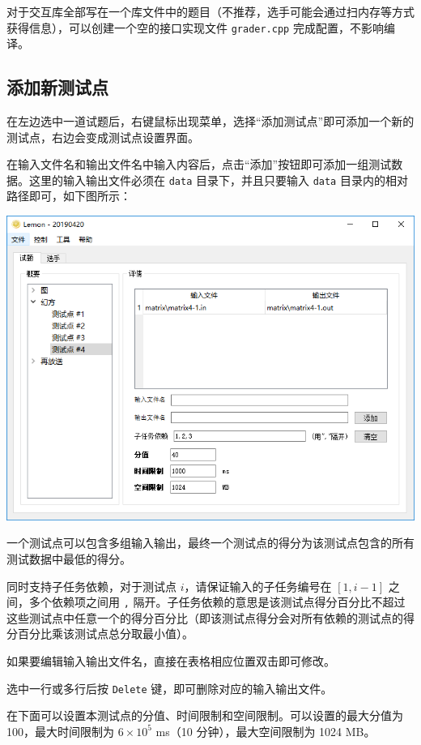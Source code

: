 \documentclass[12pt, a4paper]{article}
\begin{document}
对于交互库全部写在一个库文件中的题目（不推荐，选手可能会通过扫内存等方式获得信息），可以创建一个空的接口实现文件 \texttt{grader.cpp} 完成配置，不影响编译。

\subsection{添加新测试点}

在左边选中一道试题后，右键鼠标出现菜单，选择“添加测试点”即可添加一个新的测试点，右边会变成测试点设置界面。

在输入文件名和输出文件名中输入内容后，点击“添加”按钮即可添加一组测试数据。这里的输入输出文件必须在 \texttt{data} 目录下，并且只要输入 \texttt{data} 目录内的相对路径即可，如下图所示：

\begin{center}
\includegraphics[scale=0.7]{pic/edittestcase.png}
\end{center}

一个测试点可以包含多组输入输出，最终一个测试点的得分为该测试点包含的所有测试数据中最低的得分。

同时支持子任务依赖，对于测试点 $i$，请保证输入的子任务编号在 $[1, i - 1]$ 之间，多个依赖项之间用 \texttt{,} 隔开。子任务依赖的意思是该测试点得分百分比不超过这些测试点中任意一个的得分百分比（即该测试点得分会对所有依赖的测试点的得分百分比乘该测试点总分取最小值）。

如果要编辑输入输出文件名，直接在表格相应位置双击即可修改。

选中一行或多行后按 \texttt{Delete} 键，即可删除对应的输入输出文件。

在下面可以设置本测试点的分值、时间限制和空间限制。可以设置的最大分值为 100，最大时间限制为 $6 \times 10^5$ ms（10 分钟），最大空间限制为 1024 MB。
\end{document}
